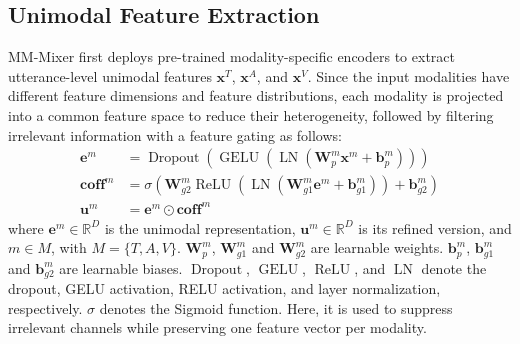 \documentclass[letterpaper]{article} %
\begin{document}
\subsection{Unimodal Feature Extraction}
MM-Mixer first deploys pre-trained modality-specific encoders to extract utterance-level unimodal features $\mathbf{x}^{T}$, $\mathbf{x}^{A}$, and $\mathbf{x}^{V}$. Since the input modalities have different feature dimensions and feature
distributions, each modality is projected into a common feature space to reduce their heterogeneity, followed by filtering irrelevant information with a feature gating as follows:
\begin{equation}
\begin{aligned}
\mathbf{e}^{m}
&=\operatorname{Dropout}\!\left(
  \operatorname{GELU}\!\left(
  \operatorname{LN}(\mathbf{W}_{p}^{m}\mathbf{x}^{m}
  +\mathbf{b}_{p}^{m})\right)\right) \\
\mathbf{coff}^{m} &= \sigma\!\left(\mathbf{W}_{g2}^{m}
  \operatorname{ReLU}\!\left(
  \operatorname{LN}(\mathbf{W}_{g1}^{m}\mathbf{e}^{m}
  +\mathbf{b}_{g1}^{m})\right)+\mathbf{b}_{g2}^{m}\right) \\
\mathbf{u}^{m} & =\mathbf{e}^{m}\odot \mathbf{coff}^{m}
\end{aligned}
\label{eq:feature_gating}
\end{equation}
where $\mathbf{e}^{m}\in\mathbb{R}^{D}$ is the unimodal representation, $\mathbf{u}^{m}\in\mathbb{R}^{D}$ is its refined version, and $m\in M$, with $M=\{T,A,V\}$. $\mathbf{W}_{p}^{m}$, $\mathbf{W}_{g1}^{m}$ and $\mathbf{W}_{g2}^{m}$ are learnable weights. $\mathbf{b}_{p}^{m}$, $\mathbf{b}_{g1}^{m}$ and $\mathbf{b}_{g2}^{m}$ are learnable biases. $\operatorname{Dropout}$, $\operatorname{GELU}$, $\operatorname{ReLU}$, and $\operatorname{LN}$ denote the dropout, GELU activation, RELU activation, and layer normalization, respectively. $\sigma$ denotes the Sigmoid function. Here, it is used to suppress irrelevant channels while preserving one feature vector per modality.

\end{document}
